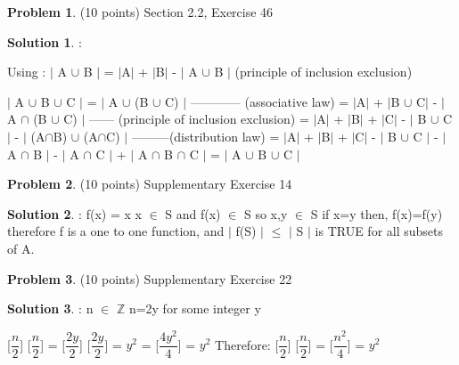 \documentclass{article}
\theoremstyle{definition}
\newtheorem{problem}{Problem}
\newtheorem*{solution}{Solution}
\begin{document}
\begin{problem} (10 points) 
Section 2.2, Exercise 46\\
\end{problem}
\begin{solution}:
\newline

Using : $|$ A $\cup$ B $|$ = $|$A$|$ + $|$B$|$ - $|$ A $\cup$ B $|$ (principle of inclusion exclusion)
\newline

$|$ A $\cup$ B $\cup$ C $|$ = $|$ A $\cup$ (B $\cup$ C) $|$ ------------ (associative law)
\newline
 = $|$A$|$ + $|$B $\cup$ C$|$ - $|$ A $\cap$ (B $\cup$ C) $|$ ------ (principle of inclusion exclusion)
\newline
 = $|$A$|$ + $|$B$|$ + $|$C$|$ - $|$ B $\cup$ C $|$ - $|$ (A$\cap$B) $\cup$ (A$\cap$C) $|$ ---------(distribution law)
 \newline
 = $|$A$|$ + $|$B$|$ + $|$C$|$ - $|$ B $\cup$ C $|$ - $|$ A $\cap$ B $|$ - $|$ A $\cap$ C $|$ + $|$ A $\cap$ B $\cap$ C $|$
 \newline
 = $|$ A $\cup$ B $\cup$ C $|$

\end{solution}

\newpage

\begin{problem} (10 points) 
Supplementary Exercise 14
\end{problem}
\begin{solution}:
\newline
f(x) = x
\newline
x $\in$ S and f(x) $\in$ S
\newline
so x,y $\in$ S
\newline
if x=y then,
\newline
f(x)=f(y) therefore f is a one to one function, and
\newline
$|$ f(S) $|$ $\leq$ $|$ S $|$ is TRUE for all subsets of A.
\end{solution}

\newpage

\begin{problem} (10 points) 
Supplementary Exercise 22
\end{problem}
\begin{solution}:
\newline
n $\in$ $\mathbb{Z}$
\bigskip
\newline
n=2y for some integer y

[$\dfrac{n}{2}$] [$\dfrac{n}{2}$] = [$\dfrac{2y}{2}$] [$\dfrac{2y}{2}$]
\bigskip
\newline
= $y^2$
\bigskip
\newline
[$\dfrac{n^2}{4}$] = [$\dfrac{4y^2}{4}$] = $y^2$
\bigskip
\newline
Therefore: 
[$\dfrac{n}{2}$] [$\dfrac{n}{2}$] = [$\dfrac{n^2}{4}$] = $y^2$
\end{solution}
\end{document}
